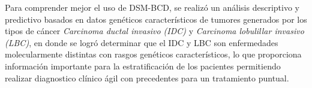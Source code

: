  Para comprender mejor el uso de DSM-BCD, se realizó un análisis descriptivo y predictivo basados en datos genéticos característicos de tumores generados por los tipos de cáncer \textit{Carcinoma ductal invasivo (IDC)} y \textit{Carcinoma lobulillar invasivo (LBC)}, en donde se logró determinar que el IDC y LBC son enfermedades molecularmente distintas con rasgos genéticos característicos, lo que proporciona información importante para la estratificación de los pacientes permitiendo realizar diagnostico clínico ágil con precedentes para un tratamiento puntual.
 
 
 
 
 
 
 
 
 
 
